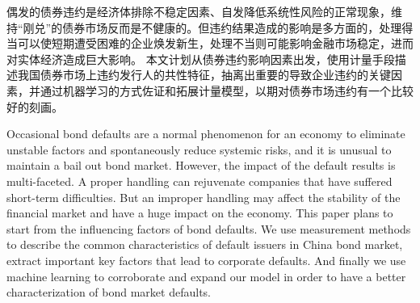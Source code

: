 \begin{cabstract}
	偶发的债券违约是经济体排除不稳定因素、自发降低系统性风险的正常现象，维持“刚兑”的债券市场反而是不健康的。但违约结果造成的影响是多方面的，处理得当可以使短期遭受困难的企业焕发新生，处理不当则可能影响金融市场稳定，进而对实体经济造成巨大影响。
	本文计划从债券违约影响因素出发，使用计量手段描述我国债券市场上违约发行人的共性特征，抽离出重要的导致企业违约的关键因素，并通过机器学习的方式佐证和拓展计量模型，以期对债券市场违约有一个比较好的刻画。
\end{cabstract}
\begin{eabstract}
	Occasional bond defaults are a normal phenomenon for an economy to eliminate unstable factors and spontaneously reduce systemic risks, and it is unusual to maintain a bail out bond market. However, the impact of the default results is multi-faceted. A proper handling can rejuvenate companies that have suffered short-term difficulties. But an improper handling may affect the stability of the financial market and have a huge impact on the economy.
	This paper plans to start from the influencing factors of bond defaults. We use measurement methods to describe the common characteristics of default issuers in China bond market, extract important key factors that lead to corporate defaults. And finally we use machine learning to corroborate and expand our model in order to  have a better characterization of bond market defaults.
\end{eabstract}

